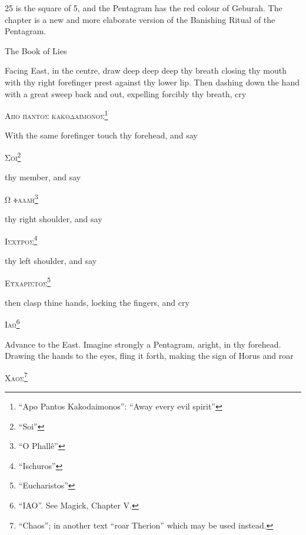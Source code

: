 
\epigraph{25 is the square of 5, and the Pentagram has the red colour of Geburah. The chapter is a new and more elaborate version of the Banishing Ritual of the Pentagram.}{The Book of Lies}


Facing East, in the centre, draw deep deep deep thy breath closing thy mouth with thy right forefinger prest against thy lower lip. Then dashing down the hand with a great sweep back and out, expelling forcibly thy breath, cry


\begin{quoting}[indentfirst=false]
\textgreek{\textsc{Απο παντος κακοδαιμονος}}\footnote{\enquote{Apo Pantos Kakodaimonos}: \enquote{Away every evil spirit}}
\end{quoting}

With the same forefinger touch thy forehead, and say
\begin{quoting}[indentfirst=false]
\textgreek{\textsc{Σοι}}\footnote{\enquote{Soi}}
\end{quoting}

thy member, and say
\begin{quoting}[indentfirst=false]
\textgreek{\textsc{Ω φαλλη}}\footnote{\enquote{O Phall\^e}}
\end{quoting}

thy right shoulder, and say
\begin{quoting}[indentfirst=false]
\textgreek{\textsc{Ισχυροσ}}\footnote{\enquote{Ischuros}}
\end{quoting}

thy left shoulder, and say
\begin{quoting}[indentfirst=false]
\textgreek{\textsc{Ευχαριστοσ}}\footnote{\enquote{Eucharistos}}
\end{quoting}

then clasp thine hands, locking the fingers, and cry
\begin{quoting}[indentfirst=false]
\textgreek{\textsc{Ιαω}}\footnote{\enquote{IAO}. See Magick, Chapter V.}
\end{quoting}

Advance to the East. Imagine strongly a Pentagram, aright, in thy forehead. Drawing the hands to the eyes, fling it forth, making the sign of Horus and roar
\begin{quoting}[indentfirst=false]
\textgreek{\textsc{Χαοσ}}\footnote{\enquote{Chaos}; in another text \enquote{roar Therion} which may be used instead.}
\end{quoting}

